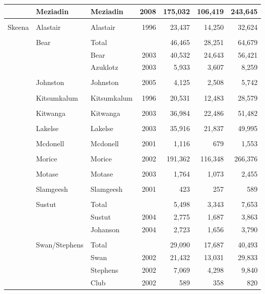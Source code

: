 \documentclass[french,11pt]{book}
\begin{document}
\begin{longtable}[t]{lllrrrr}
\cmidrule(l){2-7}\\  & Meziadin & Meziadin & 2008 & 175,032 & 106,419 & 243,645\\
\midrule\\ Skeena & Alastair & Alastair & 1996 & 23,437 & 14,250 & 32,624\\
\cmidrule(l){2-7}\\  & Bear & Total &  & 46,465 & 28,251 & 64,679\\  &  & Bear & 2003 & 40,532 & 24,643 & 56,421\\  &  & Azuklotz & 2003 & 5,933 & 3,607 & 8,259\\
\cmidrule(l){2-7}\\  & Johnston & Johnston & 2005 & 4,125 & 2,508 & 5,742\\
\cmidrule(l){2-7}\\  & Kitsumkalum & Kitsumkalum & 1996 & 20,531 & 12,483 & 28,579\\
\cmidrule(l){2-7}\\  & Kitwanga & Kitwanga & 2003 & 36,984 & 22,486 & 51,482\\
\cmidrule(l){2-7}\\  & Lakelse & Lakelse & 2003 & 35,916 & 21,837 & 49,995\\
\cmidrule(l){2-7}\\  & Mcdonell & Mcdonell & 2001 & 1,116 & 679 & 1,553\\
\cmidrule(l){2-7}\\  & Morice & Morice & 2002 & 191,362 & 116,348 & 266,376\\
\cmidrule(l){2-7}\\  & Motase & Motase & 2003 & 1,764 & 1,073 & 2,455\\
\cmidrule(l){2-7}\\  & Slamgeesh & Slamgeesh & 2001 & 423 & 257 & 589\\
\cmidrule(l){2-7}\\  & Sustut & Total &  & 5,498 & 3,343 & 7,653\\  &  & Sustut & 2004 & 2,775 & 1,687 & 3,863\\  &  & Johanson & 2004 & 2,723 & 1,656 & 3,790\\
\cmidrule(l){2-7}\\  & Swan/Stephens & Total &  & 29,090 & 17,687 & 40,493\\  &  & Swan & 2002 & 21,432 & 13,031 & 29,833\\  &  & Stephens & 2002 & 7,069 & 4,298 & 9,840\\  &  & Club & 2002 & 589 & 358 & 820\\* \end{longtable}
\end{document}
